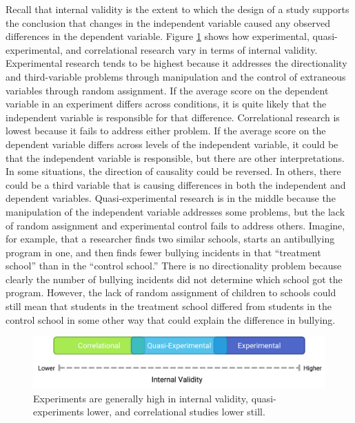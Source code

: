 \documentclass[
]{krantz}
\begin{document}
Recall that internal validity is the extent to which the design of a study supports the conclusion that changes in the independent variable caused any observed differences in the dependent variable. Figure \ref{fig:validity} shows how experimental, quasi-experimental, and correlational research vary in terms of internal validity. Experimental research tends to be highest because it addresses the directionality and third-variable problems through manipulation and the control of extraneous variables through random assignment. If the average score on the dependent variable in an experiment differs across conditions, it is quite likely that the independent variable is responsible for that difference. Correlational research is lowest because it fails to address either problem. If the average score on the dependent variable differs across levels of the independent variable, it could be that the independent variable is responsible, but there are other interpretations. In some situations, the direction of causality could be reversed. In others, there could be a third variable that is causing differences in both the independent and dependent variables. Quasi-experimental research is in the middle because the manipulation of the independent variable addresses some problems, but the lack of random assignment and experimental control fails to address others. Imagine, for example, that a researcher finds two similar schools, starts an antibullying program in one, and then finds fewer bullying incidents in that ``treatment school'' than in the ``control school.'' There is no directionality problem because clearly the number of bullying incidents did not determine which school got the program. However, the lack of random assignment of children to schools could still mean that students in the treatment school differed from students in the control school in some other way that could explain the difference in bullying.

\begin{figure}

{\centering \includegraphics[width=0.9\linewidth]{images/nonexperiments/validity} 

}

\caption{Experiments are generally high in internal validity, quasi-experiments lower, and correlational studies lower still.}\label{fig:validity}
\end{figure}
\end{document}
